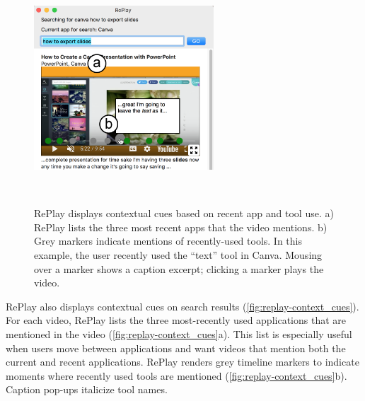 \begin{figure}[t!]
\centering
  \includegraphics[width=0.6\textwidth]{replay/figures/context_cues.png}
  \caption[RePlay displays contextual cues based on recent app and tool use. a) RePlay lists the three most recent apps that the video mentions. b) Grey markers indicate mentions of recently-used tools. Mousing over a marker shows a caption excerpt; clicking a marker plays the video.]{RePlay displays contextual cues based on recent app and tool use. a) RePlay lists the three most recent apps that the video mentions. b) Grey markers indicate mentions of recently-used tools. In this example, the user recently used the ``text'' tool in Canva. Mousing over a marker shows a caption excerpt; clicking a marker plays the video. }~\label{fig:replay-context_cues}
\end{figure}

RePlay also displays contextual cues \cite{Ekstrand2011} on search results (\autoref{fig:replay-context_cues}). For each video, RePlay lists the three most-recently used applications that are mentioned in the video (\autoref{fig:replay-context_cues}a). This list is especially useful when users move between applications and want videos that mention both the current and recent applications. RePlay renders grey timeline markers to indicate moments where recently used tools are mentioned (\autoref{fig:replay-context_cues}b). Caption pop-ups italicize tool names.

